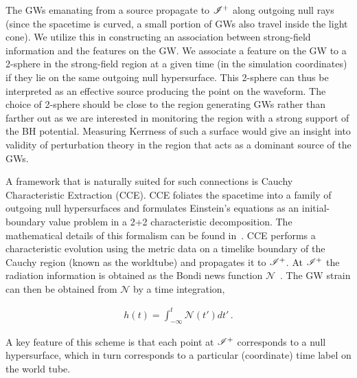 The GWs emanating from a source propagate to $\mathscr{I^+}$ along outgoing null rays (since the spacetime is curved, a small portion of GWs also travel inside the light cone). We utilize this in constructing an association between strong-field information and the features on the GW.  We associate a feature on the GW to a 2-sphere in the strong-field region at a given time (in the simulation coordinates) if they lie on the same outgoing null hypersurface. This 2-sphere can thus be interpreted as an effective source producing the point on the waveform. The choice of 2-sphere should be close to the region generating GWs rather
than farther out as we are interested in monitoring the region with a strong support of the BH potential. Measuring Kerrness of such a surface would give an insight into validity of perturbation theory in the region that acts as a dominant source of the GWs. 


A framework that is naturally suited for such connections is Cauchy Characteristic Extraction (CCE). CCE foliates the spacetime into a family of outgoing null hypersurfaces and formulates Einstein's equations as an initial-boundary value problem in a 2+2 characteristic decomposition. The mathematical details of this formalism can be found in~\cite{Bishop,Casey}. CCE performs a characteristic evolution using the metric data on a timelike boundary of the Cauchy region (known as the worldtube) and propagates it to $\mathscr{I^+}$. At $\mathscr{I^+}$ the radiation information is obtained as the Bondi news function  $\mathcal{N}$~\cite{Bondi}. The GW strain can then be obtained from $\mathcal{N}$ by a time integration,

\begin{align}
h(t)= \int_{-\infty}^{t} \mathcal{N}(t') dt'\,.
\end{align} 


 A key feature of this scheme is that each point at $\mathscr{I^+}$
 corresponds to a null hypersurface, which in turn corresponds to a particular (coordinate) time label on the world tube.
 
